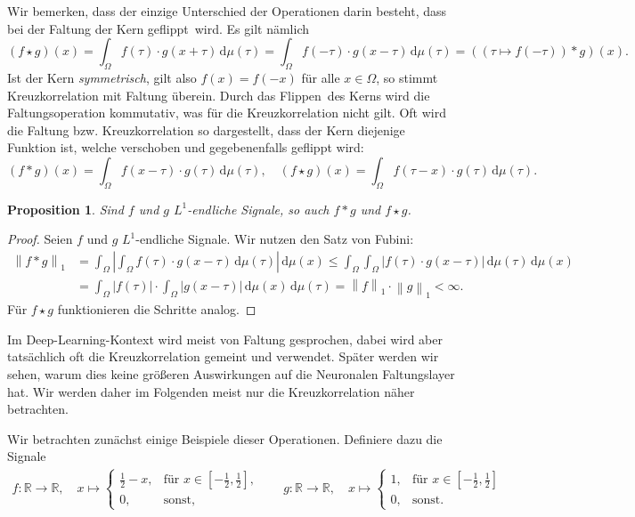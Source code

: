 \documentclass[paper=a4, 	%
		fontsize=11pt, 		%
		abstracton, 	%
		headsepline, 	%
		notitlepage	%
		]{scrartcl}
\newtheorem{proposition}[theorem]{Proposition}
\theoremstyle{definition}
\newcommand{\R}{\mathbb{R}}
\newcommand{\diff}{\,\textrm{d}}
\newcommand{\todo}[1]{{\color{red} #1}}
\newcommand{\norm}[1]{\left\lVert#1\right\rVert}
\newcommand{\abs}[1]{\left\lvert#1\right\rvert}
\begin{document}
Wir bemerken, dass der einzige Unterschied der Operationen darin besteht, dass bei der Faltung der Kern \glqq geflippt\grqq\ wird.
Es gilt nämlich \[
    \left(f \star g\right)(x) = \int_{\Omega} f(\tau) \cdot g(x+\tau) \diff\mu(\tau) = \int_\Omega f(-\tau) \cdot g(x - \tau) \diff\mu(\tau) = \left((\tau\mapsto f(-\tau)) * g\right)(x).
\]
Ist der Kern \emph{symmetrisch}, gilt also $f(x) = f(-x)$ für alle $x\in\Omega$, so stimmt Kreuzkorrelation mit Faltung überein.
Durch das \glqq Flippen\grqq\ des Kerns wird die Faltungsoperation kommutativ, was für die Kreuzkorrelation nicht gilt.
Oft wird die Faltung bzw. Kreuzkorrelation so dargestellt, dass der Kern diejenige Funktion ist, welche verschoben und gegebenenfalls geflippt wird:
\[
    (f*g)(x) = \int_\Omega f(x - \tau) \cdot g(\tau)\diff\mu(\tau), \quad
    (f\star g)(x) = \int_\Omega f(\tau - x) \cdot g(\tau) \diff\mu(\tau).
\]

\begin{proposition}
    Sind $f$ und $g$ $L^1$-endliche Signale, so auch $f * g$ und $f\star g$.
\end{proposition}
\begin{proof}
    Seien $f$ und $g$ $L^1$-endliche Signale. Wir nutzen den Satz von Fubini:
    \begin{align*}
        \norm{f * g}_1
        &= \int_{\Omega} \abs{ \int_\Omega f(\tau)\cdot g(x - \tau) \diff\mu(\tau) }\diff \mu(x)
        \leq \int_{\Omega}  \int_{\Omega} \abs{f(\tau)\cdot g(x - \tau)} \diff\mu(\tau) \diff \mu(x)\\
        &= \int_{\Omega} \abs{f(\tau)} \cdot \int_{\Omega} \abs{g(x-\tau)} \diff \mu(x) \diff\mu(\tau)
        = \norm{f}_1 \cdot \norm{g}_1 < \infty.
    \end{align*}
    Für $f \star g$ funktionieren die Schritte analog.
\end{proof}

Im Deep-Learning-Kontext wird meist von Faltung gesprochen, dabei wird aber tatsächlich oft die Kreuzkorrelation gemeint und verwendet.
\todo{Später werden wir sehen, warum dies keine größeren Auswirkungen auf die Neuronalen Faltungslayer hat.}
Wir werden daher im Folgenden meist nur die Kreuzkorrelation näher betrachten.

Wir betrachten zunächst einige Beispiele dieser Operationen.
Definiere dazu die Signale
\begin{align*}
    f: \R \rightarrow \R, \quad x \mapsto \begin{cases}
        \frac{1}{2} - x, & \text{für $x\in[-\frac{1}{2},\frac{1}{2}]$,}\\
        0, & \text{sonst,}
    \end{cases} \qquad
    g: \R \rightarrow \R,\quad x \mapsto \begin{cases}
        1,& \text{für $x \in [-\frac{1}{2},\frac{1}{2}]$}\\
        0, & \text{sonst.}
    \end{cases}
\end{align*}
\end{document}
